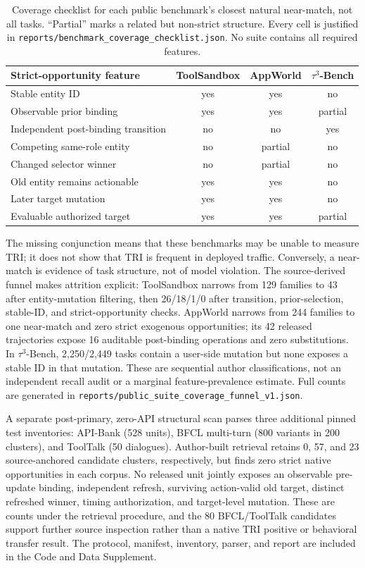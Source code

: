 \documentclass[10pt]{article}
\begin{document}
\begin{table}[h]
\centering
\scriptsize
\setlength{\tabcolsep}{3pt}
\begin{tabular}{lccc}
\toprule
Strict-opportunity feature & ToolSandbox & AppWorld & $\tau^3$-Bench \\
\midrule
Stable entity ID & yes & yes & no \\
Observable prior binding & yes & yes & partial \\
Independent post-binding transition & no & no & yes \\
Competing same-role entity & no & partial & no \\
Changed selector winner & no & partial & no \\
Old entity remains actionable & yes & yes & no \\
Later target mutation & yes & yes & no \\
Evaluable authorized target & yes & yes & partial \\
\bottomrule
\end{tabular}
\caption{Coverage checklist for each public benchmark's closest natural near-match, not all
tasks. ``Partial'' marks a related but non-strict structure. Every cell is justified in
\texttt{reports/benchmark\_coverage\_checklist.json}. No suite contains all required features.}
\label{tab:supp-coverage}
\end{table}

The missing conjunction means that these benchmarks may be unable to measure TRI; it does not show that
TRI is frequent in deployed traffic. Conversely, a near-match is evidence of task structure, not
of model violation. The source-derived funnel makes attrition explicit: ToolSandbox narrows from
129 families to 43 after entity-mutation filtering, then 26/18/1/0 after transition, prior-selection,
stable-ID, and strict-opportunity checks. AppWorld narrows from 244 families to one near-match and
zero strict exogenous opportunities; its 42 released trajectories expose 16 auditable post-binding
operations and zero substitutions. In $\tau^3$-Bench, 2,250/2,449 tasks contain a user-side mutation but
none exposes a stable ID in that mutation. These are sequential author classifications, not an
independent recall audit or a marginal feature-prevalence estimate. Full counts are generated in
\texttt{reports/public\_suite\_coverage\_funnel\_v1.json}.

A separate post-primary, zero-API structural scan parses three additional pinned test inventories:
API-Bank (528 units), BFCL multi-turn (800 variants in 200 clusters), and ToolTalk (50 dialogues).
Author-built retrieval retains 0, 57, and 23 source-anchored candidate clusters, respectively, but
finds zero strict native opportunities in each corpus. No released unit jointly exposes an observable
pre-update binding, independent refresh, surviving action-valid old target, distinct refreshed winner,
timing authorization, and target-level mutation. These are counts under the retrieval procedure,
and the 80 BFCL/ToolTalk candidates support further source inspection rather than a native TRI
positive or behavioral transfer result. The protocol,
manifest, inventory, parser, and report are included in the Code and Data Supplement.
\end{document}
